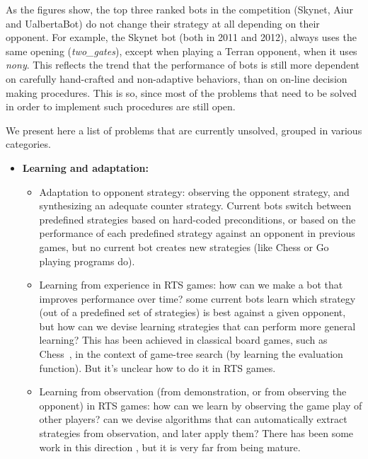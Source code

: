 \documentclass[journal]{IEEEtran}
\begin{document}
As the figures show, the top three ranked bots in the competition (Skynet, Aiur and UalbertaBot) do not change their strategy at all depending on their opponent. For example, the Skynet bot (both in 2011 and 2012), always uses the same opening (\emph{two\_gates}), except when playing a Terran opponent, when it uses \emph{nony}. This reflects the trend that the performance of bots is still more dependent on carefully hand-crafted and non-adaptive behaviors, than on on-line decision making procedures. This is so, since most of the problems that need to be solved in order to implement such procedures are still open.

We present here a list of problems that are currently unsolved, grouped in various categories.

\begin{itemize}

\item {\bf Learning and adaptation:}
\begin{itemize}
\item Adaptation to opponent strategy: observing the opponent strategy, and synthesizing an adequate counter strategy. Current bots switch between predefined strategies based on hard-coded preconditions, or based on the performance of each predefined strategy against an opponent in previous games, but no current bot creates new strategies (like Chess or Go playing programs do).
\item Learning from experience in RTS games: how can we make a bot that improves performance over time? some current bots learn which strategy (out of a predefined set of strategies) is best against a given opponent, but how can we devise learning strategies that can perform more general learning? This has been achieved in classical board games, such as Chess~\cite{tesauro2001comparison}, in the context of game-tree search (by learning the evaluation function). But it's unclear how to do it in RTS games.
\item Learning from observation (from demonstration, or from observing the opponent) in RTS games: how can we learn by observing the game play of other players? can we devise algorithms that can automatically extract strategies from observation, and later apply them? There has been some work in this direction \cite{OntanonMSR10}, but it is very far from being mature.
\end{itemize}


\end{itemize}
\end{document}

